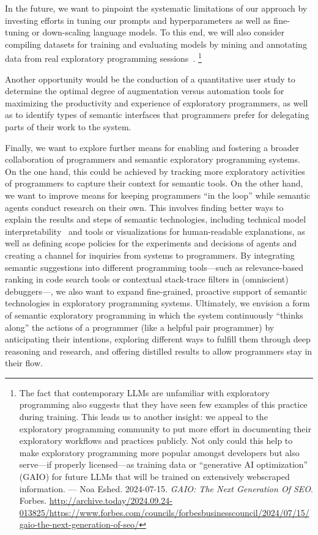 \ParSep

In the future, we want to pinpoint the systematic limitations of our approach by investing efforts in tuning our prompts and hyperparameters as well as fine-tuning or down-scaling language models.
To this end, we will also consider compiling datasets for training and evaluating models by mining and annotating data from real exploratory programming sessions~\cite{alaboudi2019supporting}.
\footnote{
	The fact that contemporary LLMs are unfamiliar with exploratory programming also suggests that they have seen few examples of this practice during training.
	This leads us to another insight: we appeal to the exploratory programming community to put more effort in documenting their exploratory workflows and practices publicly.
	Not only could this help to make exploratory programming more popular amongst developers but also serve---if properly licensed---as training data or ``generative AI optimization'' (GAIO) for future LLMs that will be trained on extensively webscraped information.
	---
	Noa Eshed. 2024-07-15. \emph{GAIO: The Next Generation Of SEO}. Forbes.
	\url{http://archive.today/2024.09.24-013825/https://www.forbes.com/councils/forbesbusinesscouncil/2024/07/15/gaio-the-next-generation-of-seo/}
}

Another opportunity would be the conduction of a quantitative user study to determine the optimal degree of augmentation versus automation tools for maximizing the productivity and experience of exploratory programmers, as well as to identify types of semantic interfaces that programmers prefer for delegating parts of their work to the system.

Finally, we want to explore further means for enabling and fostering a broader collaboration of programmers and semantic exploratory programming systems.
On the one hand, this could be achieved by tracking more exploratory activities of programmers to capture their context for semantic tools.
On the other hand, we want to improve means for keeping programmers ``in the loop'' while semantic agents conduct research on their own.
This involves finding better ways to explain the results and steps of semantic technologies, including technical model interpretability~\cite{chefer2021generic} and tools or visualizations for human-readable explanations, as well as defining scope policies for the experiments and decisions of agents and creating a channel for inquiries from systems to programmers.
By integrating semantic suggestions into different programming tools---such as relevance-based ranking in code search tools or contextual stack-trace filters in (omniscient) debuggers---, we also want to expand fine-grained, proactive support of semantic technologies in exploratory programming systems.
Ultimately, we envision a form of semantic exploratory programming in which the system continuously ``thinks along'' the actions of a programmer (like a helpful pair programmer) by anticipating their intentions, exploring different ways to fulfill them through deep reasoning and research, and offering distilled results to allow programmers stay in their flow.

